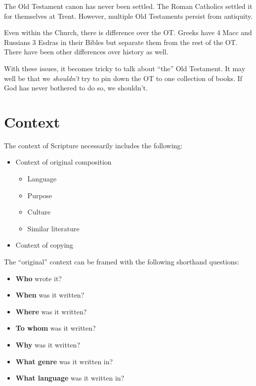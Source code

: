 \documentclass{beamer}
\begin{document}
\begin{frame}
  The Old Testament canon has never been settled.
  The Roman Catholics settled it for themselves at Trent.
  However, multiple Old Testaments persist from antiquity.
\end{frame}

\begin{frame}
  Even within the Church, there is difference over the OT.
  Greeks have 4 Macc and Russians 3 Esdras in their Bibles but separate them from the rest of the OT.
  There have been other differences over history as well.
\end{frame}

\begin{frame}
  With these issues, it becomes tricky to talk about ``the'' Old Testament.
  It may well be that we \emph{shouldn't} try to pin down the OT to one collection of books.
  If God has never bothered to do so, we shouldn't.
\end{frame}

\section{Context}

\begin{frame}
  The context of Scripture necessarily includes the following:\pause
  \begin{itemize}
	\item Context of original composition\pause
	  \begin{itemize}
		\item Language\pause
		\item Purpose\pause
		\item Culture\pause
		\item Similar literature\pause
	  \end{itemize}
	\item Context of copying
  \end{itemize}
\end{frame}

\begin{frame}
  The ``original'' context can be framed with the following shorthand questions:
  \begin{itemize}
	\item \textbf{Who} wrote it?\pause
	\item \textbf{When} was it written?\pause
	\item \textbf{Where} was it written?\pause
	\item \textbf{To whom} was it written?\pause
	\item \textbf{Why} was it written?\pause
	\item \textbf{What genre} was it written in?\pause
	\item \textbf{What language} was it written in?
  \end{itemize}
\end{frame}
\end{document}
